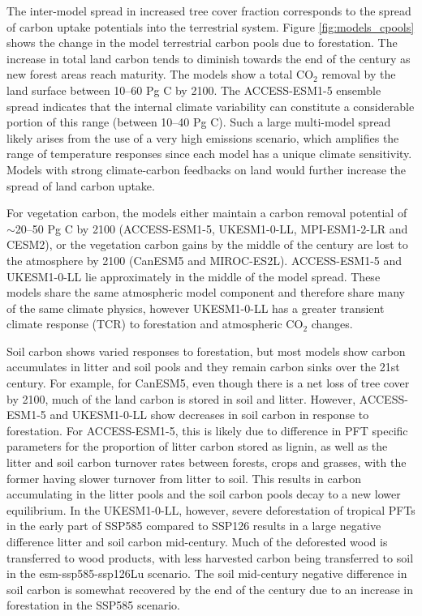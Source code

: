 \documentclass[draft]{agujournal2019}
\begin{document}
The inter-model spread in increased tree cover fraction corresponds to the spread of carbon uptake potentials into the terrestrial system.
Figure \ref{fig:models_cpools} shows the change in the model terrestrial carbon pools due to forestation.
The increase in total land carbon tends to diminish towards the end of the century as new forest areas reach maturity.
The models show a total CO$_2$ removal by the land surface between 10--60 Pg C by 2100.
The ACCESS-ESM1-5 ensemble spread indicates that the internal climate variability can constitute a considerable portion of this range (between 10--40 Pg C).
Such a large multi-model spread likely arises from the use of a very high emissions scenario, which amplifies the range of temperature responses since each model has a unique climate sensitivity.
Models with strong climate-carbon feedbacks on land would further increase the spread of land carbon uptake.

For vegetation carbon, the models either maintain a carbon removal potential of $\sim$20--50 Pg C by 2100 (ACCESS-ESM1-5, UKESM1-0-LL, MPI-ESM1-2-LR and CESM2), or the vegetation carbon gains by the middle of the century are lost to the atmosphere by 2100 (CanESM5 and MIROC-ES2L).
ACCESS-ESM1-5 and UKESM1-0-LL lie approximately in the middle of the model spread.
These models share the same atmospheric model component and therefore share many of the same climate physics, however UKESM1-0-LL has a greater transient climate response (TCR) to forestation and atmospheric CO$_2$ changes.

Soil carbon shows varied responses to forestation, but most models show carbon accumulates in litter and soil pools and they remain carbon sinks over the 21st century.
For example, for CanESM5, even though there is a net loss of tree cover by 2100, much of the land carbon is stored in soil and litter.
However, ACCESS-ESM1-5 and UKESM1-0-LL show decreases in soil carbon in response to forestation.
For ACCESS-ESM1-5, this is likely due to difference in PFT specific parameters for the proportion of litter carbon stored as lignin, as well as the litter and soil carbon turnover rates between forests, crops and grasses, with the former having slower turnover from litter to soil.
This results in carbon accumulating in the litter pools and the soil carbon pools decay to a new lower equilibrium.
In the UKESM1-0-LL, however, severe deforestation of tropical PFTs in the early part of SSP585 compared to SSP126 results in a large negative difference litter and soil carbon mid-century.
Much of the deforested wood is transferred to wood products, with less harvested carbon being transferred to soil in the esm-ssp585-ssp126Lu scenario.
The soil mid-century negative difference in soil carbon is somewhat recovered
by the end of the century due to an increase in forestation in the SSP585 scenario.
\end{document}
